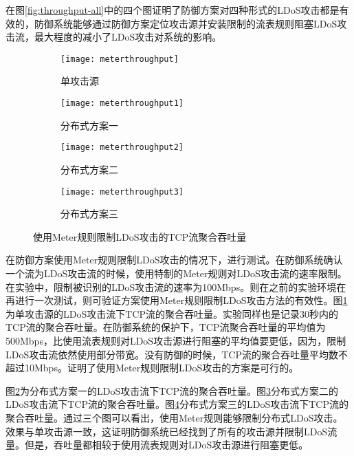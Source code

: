 在图\ref{fig:throughput-all}中的四个图证明了防御方案对四种形式的LDoS攻击都是有效的，防御系统能够通过防御方案定位攻击源并安装限制的流表规则阻塞LDoS攻击流，最大程度的减小了LDoS攻击对系统的影响。


\begin{figure}
    \begin{subfigure}{.49\textwidth}
        \centering
        \texttt{[image: meterthroughput]}
        \caption{单攻击源}
        \label{fig:meter-throughput-single}
    \end{subfigure}
    \begin{subfigure}{.49\textwidth}
        \centering
        \texttt{[image: meterthroughput1]}
        \caption{分布式方案一}
        \label{fig:meter-throughput-2h-mod1}
    \end{subfigure}

    \begin{subfigure}{.49\textwidth}
        \centering
        \texttt{[image: meterthroughput2]}
        \caption{分布式方案二}
        \label{fig:meter-throughput-2h-mod2}
    \end{subfigure}
    \begin{subfigure}{.49\textwidth}
        \centering
        \texttt{[image: meterthroughput3]}
        \caption{分布式方案三}
        \label{fig:meter-throughput-2h-mod3}
    \end{subfigure}


    \caption{使用Meter规则限制LDoS攻击的TCP流聚合吞吐量}
    \label{fig:meter-throughput-all}
\end{figure}


在防御方案使用Meter规则限制LDoS攻击的情况下，进行测试。在防御系统确认一个流为LDoS攻击流的时候，使用特制的Meter规则对LDoS攻击流的速率限制。在实验中，限制被识别的LDoS攻击流的速率为100Mbps。则在之前的实验环境在再进行一次测试，则可验证方案使用Meter规则限制LDoS攻击方法的有效性。图\ref{fig:meter-throughput-single}为单攻击源的LDoS攻击流下TCP流的聚合吞吐量。实验同样也是记录30秒内的TCP流的聚合吞吐量。在防御系统的保护下，TCP流聚合吞吐量的平均值为500Mbps，比使用流表规则对LDoS攻击源进行阻塞的平均值要更低，因为，限制LDoS攻击流依然使用部分带宽。没有防御的时候，TCP流的聚合吞吐量平均数不超过10Mbps。证明了使用Meter规则限制LDoS攻击的方案是可行的。

图\ref{fig:meter-throughput-2h-mod1}为分布式方案一的LDoS攻击流下TCP流的聚合吞吐量。图\ref{fig:meter-throughput-2h-mod2}分布式方案二的LDoS攻击流下TCP流的聚合吞吐量。图\ref{fig:meter-throughput-2h-mod3}分布式方案三的LDoS攻击流下TCP流的聚合吞吐量。通过三个图可以看出，使用Meter规则能够限制分布式LDoS攻击。效果与单攻击源一致，这证明防御系统已经找到了所有的攻击源并限制LDoS流量。但是，吞吐量都相较于使用流表规则对LDoS攻击源进行阻塞更低。

